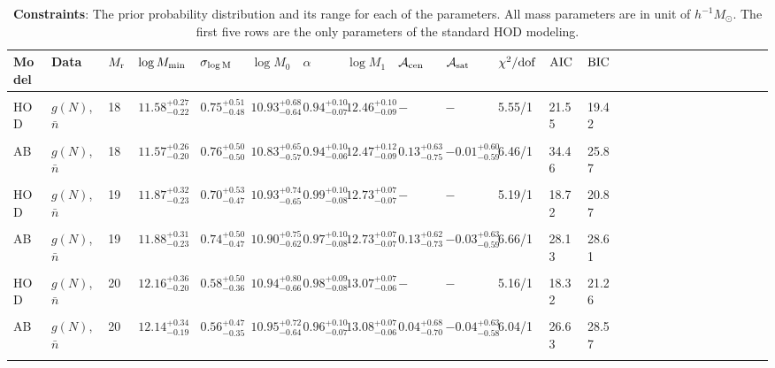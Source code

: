 \documentclass[14pt, preprint]{emulateapj}
\newcommand{\gmf}{g(N)}
\newcommand{\mr}{M_{\rm r}}
\newcommand{\mzero}{\log M_{0}}
\newcommand{\mone}{\log M_{1}}
\newcommand{\mmin}{\log M_{\rm min}}
\newcommand{\sigmam}{\sigma_{\log \rm M}}
\newcommand{\acen}{\mathcal{A}_{\rm cen}}
\newcommand{\asat}{\mathcal{A}_{\rm sat}}
\begin{document}
\begin{table*}
\begin{center}
  \label{tab:prior}
  \caption{{\bf Constraints}: The prior probability distribution 
  and its range for each of the parameters. 
  All mass parameters are in unit of $h^{-1}M_\odot$. The first five rows are the only parameters of the standard HOD modeling.}
\begin{tabular}{@{}lllllllllllllllllllllllll}
\\ \hline 
    Model & Data & $\mr$ & $\mmin$ & $\sigmam$ & $\mzero$ & $\alpha$ &  $\mone$ & $\acen$ & $\asat$ & $\chi^{2}/\rm{dof}$ & $\rm{AIC}$ & $\rm{BIC}$\\  \hline
  \\
  HOD & $\gmf$, $\bar{n}$ & 18 & $11.58^{+0.27}_{-0.22}$ &  $0.75^{+0.51}_{-0.48}$ & $10.93^{+0.68}_{-0.64}$ & $0.94^{+0.10}_{-0.07}$ &  $12.46^{+0.10}_{-0.09}$ & $-$ & $-$ & 5.55/1 & 21.55 & 19.42\\ \\
  
  AB & $\gmf$, $\bar{n}$ & 18 & $11.57^{+0.26}_{-0.20}$ &  $0.76^{+0.50}_{-0.50}$ & $10.83^{+0.65}_{-0.57}$ & $0.94^{+0.10}_{-0.06}$ &  $12.47^{+0.12}_{-0.09}$ & $0.13^{+0.63}_{-0.75}$ & $-0.01^{+0.60}_{-0.59}$ & 6.46/1 & 34.46 & 25.87\\ \\
   
HOD & $\gmf$, $\bar{n}$ & 19 & $11.87^{+0.32}_{-0.23}$ &  $0.70^{+0.53}_{-0.47}$ & $10.93^{+0.74}_{-0.65}$ & $0.99^{+0.10}_{-0.08}$ &  $12.73^{+0.07}_{-0.07}$ & $-$ & $-$ & 5.19/1 & 18.72 & 20.87\\ \\
    
AB & $\gmf$, $\bar{n}$ & 19 & $11.88^{+0.31}_{-0.23}$ &  $0.74^{+0.50}_{-0.47}$ & $10.90^{+0.75}_{-0.62}$ & $0.97^{+0.10}_{-0.08}$ &  $12.73^{+0.07}_{-0.07}$ & $0.13^{+0.62}_{-0.73}$ & $-0.03^{+0.63}_{-0.59}$ & 6.66/1 & 28.13 & 28.61\\ \\

HOD  & $\gmf$, $\bar{n}$ & 20 & $12.16^{+0.36}_{-0.20}$ &  $0.58^{+0.50}_{-0.36}$ & $10.94^{+0.80}_{-0.66}$ & $0.98^{+0.09}_{-0.08}$ &  $13.07^{+0.07}_{-0.06}$ & $-$ & $-$ & 5.16/1 & 18.32 & 21.26\\ \\

AB  & $\gmf$, $\bar{n}$ & 20 & $12.14^{+0.34}_{-0.19}$ &  $0.56^{+0.47}_{-0.35}$ & $10.95^{+0.72}_{-0.64}$ & $0.96^{+0.10}_{-0.07}$ &  $13.08^{+0.07}_{-0.06}$ & $0.04^{+0.68}_{-0.70}$ & $-0.04^{+0.63}_{-0.58}$ & 6.04/1 & 26.63 & 28.57\\ \\


\end{tabular}
\end{center}
\end{table*}
\end{document}
